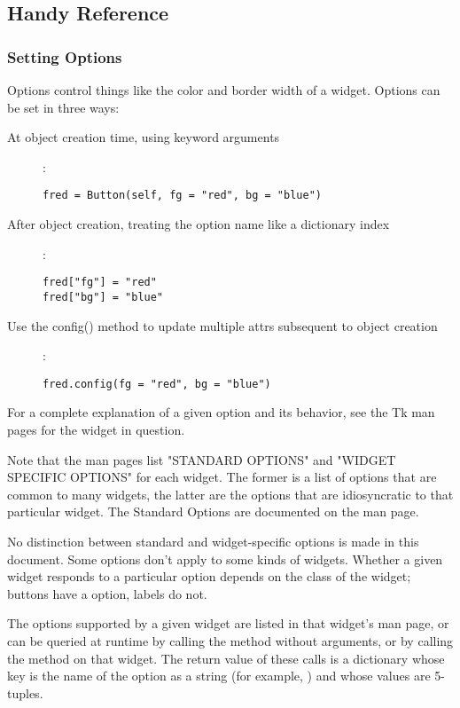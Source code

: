 \subsection{Handy Reference}

\subsubsection{Setting Options
               \label{tkinter-setting-options}}

Options control things like the color and border width of a widget.
Options can be set in three ways:

\begin{description}
\item[At object creation time, using keyword arguments]:
\begin{verbatim}
fred = Button(self, fg = "red", bg = "blue")
\end{verbatim}
\item[After object creation, treating the option name like a dictionary index]:
\begin{verbatim}
fred["fg"] = "red"
fred["bg"] = "blue"
\end{verbatim}
\item[Use the config() method to update multiple attrs subsequent to
object creation]:
\begin{verbatim}
fred.config(fg = "red", bg = "blue")
\end{verbatim}
\end{description}

For a complete explanation of a given option and its behavior, see the
Tk man pages for the widget in question.

Note that the man pages list "STANDARD OPTIONS" and "WIDGET SPECIFIC
OPTIONS" for each widget.  The former is a list of options that are
common to many widgets, the latter are the options that are
idiosyncratic to that particular widget.  The Standard Options are
documented on the  man page.

No distinction between standard and widget-specific options is made in
this document.  Some options don't apply to some kinds of widgets.
Whether a given widget responds to a particular option depends on the
class of the widget; buttons have a  option, labels do not. 

The options supported by a given widget are listed in that widget's
man page, or can be queried at runtime by calling the
 method without arguments, or by calling the
 method on that widget.  The return value of these
calls is a dictionary whose key is the name of the option as a string
(for example, ) and whose values are 5-tuples.

